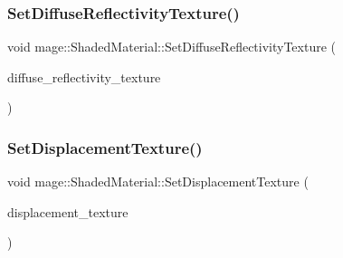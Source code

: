 \hypertarget{structmage_1_1_shaded_material_add7475d986df558d289952a6ae2dbd73}{}\label{structmage_1_1_shaded_material_add7475d986df558d289952a6ae2dbd73} 
\subsubsection{\texorpdfstring{Set\+Diffuse\+Reflectivity\+Texture()}{SetDiffuseReflectivityTexture()}}
{\footnotesize\ttfamily void mage\+::\+Shaded\+Material\+::\+Set\+Diffuse\+Reflectivity\+Texture (\begin{DoxyParamCaption}\item[{\hyperlink{namespacemage_a1e01ae66713838a7a67d30e44c67703e}{Shared\+Ptr}$<$ \hyperlink{classmage_1_1_texture}{Texture} $>$}]{diffuse\+\_\+reflectivity\+\_\+texture }\end{DoxyParamCaption})}

\hypertarget{structmage_1_1_shaded_material_ab96c9ab7165ebb330790b15460b53c3b}{}\label{structmage_1_1_shaded_material_ab96c9ab7165ebb330790b15460b53c3b} 
\subsubsection{\texorpdfstring{Set\+Displacement\+Texture()}{SetDisplacementTexture()}}
{\footnotesize\ttfamily void mage\+::\+Shaded\+Material\+::\+Set\+Displacement\+Texture (\begin{DoxyParamCaption}\item[{\hyperlink{namespacemage_a1e01ae66713838a7a67d30e44c67703e}{Shared\+Ptr}$<$ \hyperlink{classmage_1_1_texture}{Texture} $>$}]{displacement\+\_\+texture }\end{DoxyParamCaption})}

\hypertarget{structmage_1_1_shaded_material_a403f3e4e673d31fffdb387f518393453}{}\label{structmage_1_1_shaded_material_a403f3e4e673d31fffdb387f518393453} 
